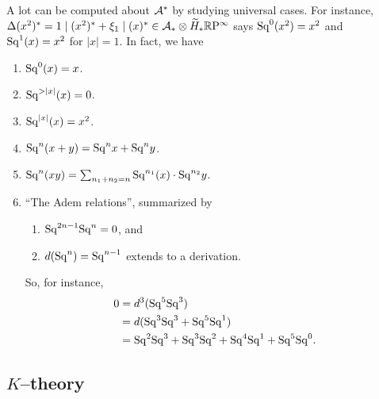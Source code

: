\begin{remark}
A lot can be computed about $\mathcal A^*$ by studying universal cases.
For instance, $\Delta(x^2)^* = 1 \mid (x^2)^* + \xi_1 \mid (x)^* \in \mathcal A_* \otimes \widetilde H_* \mathbb R \mathrm{P}^\infty$ says $\mathrm{Sq}^0(x^2) = x^2$ and $\mathrm{Sq}^1(x) = x^2$ for $|x| = 1$.
In fact, we have
\begin{enumerate}
    \item $\mathrm{Sq}^0(x) = x$.
    \item $\mathrm{Sq}^{>|x|}(x) = 0$.
    \item $\mathrm{Sq}^{|x|}(x) = x^2$.
    \item $\mathrm{Sq}^n(x+y) = \mathrm{Sq}^n x + \mathrm{Sq}^n y$.
    \item $\mathrm{Sq}^n(xy) = \sum_{n_1 + n_2 = n} \mathrm{Sq}^{n_1}(x) \cdot \mathrm{Sq}^{n_2} y$.
    \item ``The Adem relations'', summarized by
    \begin{enumerate}
        \item $\mathrm{Sq}^{2n-1} \mathrm{Sq}^n = 0$, and
        \item $d(\mathrm{Sq}^n) = \mathrm{Sq}^{n-1}$ extends to a derivation.
    \end{enumerate}
    So, for instance,
    \begin{align*}
    0 & = d^3(\mathrm{Sq}^5 \mathrm{Sq}^3) \\
    & = d(\mathrm{Sq}^3\mathrm{Sq}^3 + \mathrm{Sq}^5 \mathrm{Sq}^1) \\
    & = \mathrm{Sq}^2 \mathrm{Sq}^3 + \mathrm{Sq}^3 \mathrm{Sq}^2 + \mathrm{Sq}^4 \mathrm{Sq}^1 + \mathrm{Sq}^5 \mathrm{Sq}^0.
    \end{align*}
\end{enumerate}
\end{remark}




\begin{subappendices}

\section{$K$--theory}



\end{subappendices}

